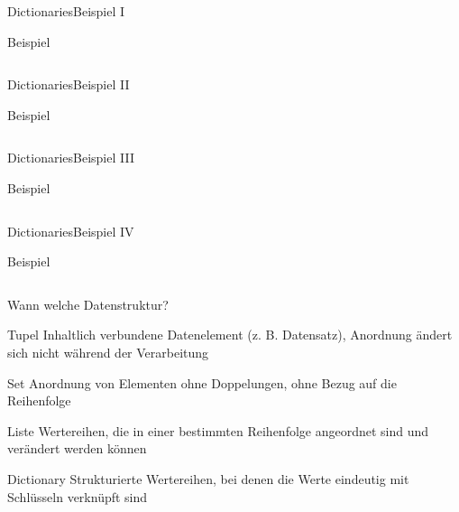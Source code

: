 \documentclass[xelatex,aspectratio=169]{beamer}
\begin{document}
\begin{frame}{Dictionaries}{Beispiel I}
    \begin{exampleblock}{Beispiel}
        \inputminted[firstline=1,lastline=11]{python}{src/dictionaries_example.py}
    \end{exampleblock}
\end{frame}
\begin{frame}{Dictionaries}{Beispiel II}
    \begin{exampleblock}{Beispiel}
        \inputminted[firstline=13,lastline=18]{python}{src/dictionaries_example.py}
    \end{exampleblock}
\end{frame}
\begin{frame}{Dictionaries}{Beispiel III}
    \vspace{-.2cm}
    \begin{exampleblock}{Beispiel}
        \inputminted[firstline=21,lastline=33]{python}{src/dictionaries_example.py}
    \end{exampleblock}
\end{frame}
\begin{frame}{Dictionaries}{Beispiel IV}
    \begin{exampleblock}{Beispiel}
        \inputminted[firstline=36,lastline=39]{python}{src/dictionaries_example.py}
    \end{exampleblock}
\end{frame}

\begin{frame}{Wann welche Datenstruktur?}

    \begin{block}{Tupel}
        Inhaltlich verbundene Datenelement (z. B. Datensatz), Anordnung ändert sich nicht während der Verarbeitung
    \end{block}

    \begin{block}{Set}
        Anordnung von Elementen ohne Doppelungen, ohne Bezug auf die Reihenfolge
    \end{block}

    \begin{block}{Liste}
        Wertereihen, die in einer bestimmten Reihenfolge angeordnet sind und verändert werden können
    \end{block}

    \begin{block}{Dictionary}
        Strukturierte Wertereihen, bei denen die Werte eindeutig mit Schlüsseln verknüpft sind
    \end{block}

\end{frame}
\end{document}
